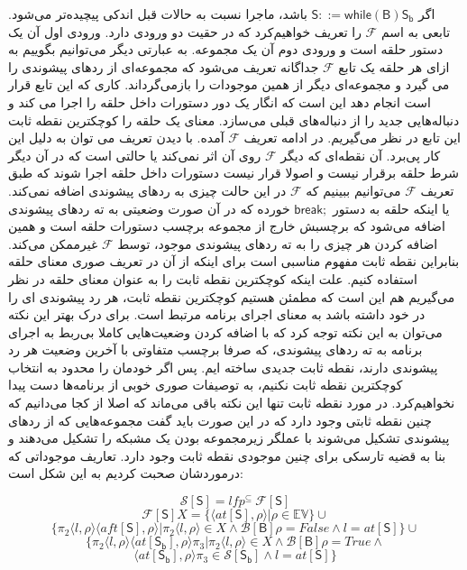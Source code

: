اگر $         \mathsf{S} ::= \mathsf{while (B)S_b }   $ باشد، ماجرا نسبت به حالات قبل اندکی پیچیده‌تر می‌شود. تابعی به اسم $\mathcal{F} $ را تعریف خواهیم‌کرد که در حقیت دو ورودی دارد. ورودی اول آن یک دستور حلقه است و ورودی دوم آن یک مجموعه. به عبارتی دیگر می‌توانیم بگوییم به ازای هر حلقه یک تابع $\mathcal{F} $  جداگانه تعریف می‌شود که مجموعه‌ای از ردهای پیشوندی را می گیرد و مجموعه‌ای دیگر از همین موجودات را بازمی‌گرداند. کاری که این تابع قرار است انجام دهد این است که انگار یک دور دستورات داخل حلقه را اجرا می کند و دنباله‌هایی جدید را از دنباله‌های قبلی می‌سازد. معنای یک حلقه را کوچکترین نقطه ثابت این تابع در نظر می‌گیریم. در ادامه تعریف $\mathcal{F} $ آمده. با دیدن تعریف می توان به دلیل این کار پی‌برد. آن نقطه‌ای که دیگر $\mathcal{F} $ روی آن اثر نمی‌کند یا حالتی است که در آن دیگر شرط حلقه برقرار نیست و اصولا قرار نیست دستورات داخل حلقه اجرا شوند که طبق تعریف $\mathcal{F} $  می‌توانیم ببینیم که $\mathcal{F} $  در این حالت چیزی به ردهای پیشوندی اضافه نمی‌کند. یا اینکه حلقه به دستور $\mathsf{break;}$ خورده که در آن صورت وضعیتی به ته ردهای پیشوندی اضافه می‌شود که برچسبش خارج از مجموعه برچسب دستورات حلقه است و همین اضافه کردن هر چیزی را به ته ردهای پیشوندی موجود، توسط $\mathcal{F} $  غیرممکن می‌کند. بنابراین نقطه ثابت مفهوم مناسبی است برای اینکه از آن در تعریف صوری معنای حلقه استفاده کنیم. علت اینکه کوچکترین نقطه ثابت را به عنوان معنای حلقه در نظر می‌گیریم هم این است که مطمئن هستیم کوچکترین نقطه ثابت، هر رد پیشوندی ای را در خود داشته باشد به معنای اجرای برنامه مرتبط است. برای درک بهتر این نکته می‌توان به این نکته توجه کرد که با اضافه کردن وضعیت‌هایی کاملا بی‌ربط به اجرای برنامه به ته رد‌های پیشوندی، که صرفا برچسب متفاوتی با آخرین وضعیت هر رد پیشوندی دارند، نقطه ثابت جدیدی ساخته ایم. پس اگر خودمان را محدود به انتخاب کوچکترین نقطه ثابت نکنیم، به توصیفات صوری خوبی از برنامه‌ها دست پیدا نخواهیم‌کرد. در مورد نقطه ثابت تنها این نکته باقی می‌ماند که اصلا از کجا می‌دانیم که چنین نقطه ثابتی وجود دارد که در این صورت باید گفت مجموعه‌هایی که از ردهای پیشوندی تشکیل می‌شوند با عملگر زیرمجموعه بودن یک مشبکه را تشکیل می‌دهند و بنا به قضیه تارسکی\cite{tarski} برای چنین موجودی نقطه ثابت وجود دارد.
تعاریف موجوداتی که درموردشان صحبت کردیم به این شکل است:

$$\mathcal{S} [\mathsf{S}] = lfp^{\subseteq}\: \mathcal{F[\mathsf{S}]}      $$ $$\mathcal{F} [\mathsf{S}] X= \{ \langle at[\mathsf{S}] , \rho \rangle | \rho \in \mathbb{EV}       \} \cup $$
$$  \{ \pi_2 \langle l ,\rho \rangle \langle aft[\mathsf{S}],\rho \rangle |  \pi_2 \langle l ,\rho \rangle \in X \wedge \mathcal{B}[\mathsf{B}]\rho=False \wedge l= at[\mathsf{S}]   \} \cup      $$
$$  \{ \pi_2 \langle l ,\rho \rangle \langle at[\mathsf{S_b}],\rho \rangle \pi_3 |  \pi_2 \langle l ,\rho \rangle \in X \wedge \mathcal{B}[\mathsf{B}]\rho=True \wedge$$$$  \langle at[\mathsf{S_b}],\rho \rangle \pi_3 \in  \mathcal{S} [\mathsf{S_b}]   \wedge   l= at[\mathsf{S}]  \}  $$\\

